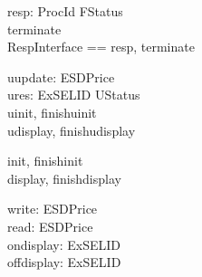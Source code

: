 \begin{circus}
	\circchannel\ resp: ProcId \cross FStatus \\
    \circchannel\ terminate \\
    \circchannelset\ RespInterface == \lchanset resp, terminate \rchanset
\end{circus}

\begin{circus}
	\circchannel\ uupdate: ESDPrice \\
	\circchannel\ ures: ExSELID \cross UStatus \\
	\circchannel\ uinit, finishuinit\\
	\circchannel\ udisplay, finishudisplay
\end{circus}

\begin{circus}
	\circchannel\ init, finishinit \\
	\circchannel\ display, finishdisplay
\end{circus}

\begin{circus}
	\circchannel\ write: ESDPrice \\
	\circchannel\ read: ESDPrice \\
	\circchannel\ ondisplay: ExSELID \\
	\circchannel\ offdisplay: ExSELID
\end{circus}



